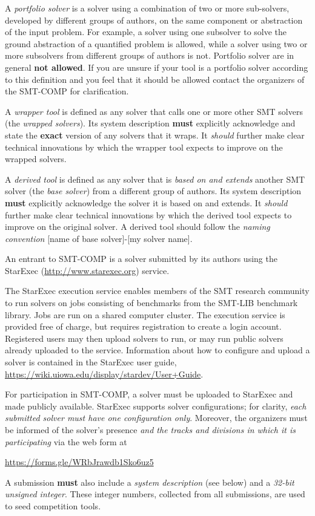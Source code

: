 \documentclass[12pt]{article}
\begin{document}
%
A \emph{portfolio solver} is a solver using a combination of two or
more sub-solvers, developed by different groups of authors, on the
same component or abstraction of the input problem.  For example, a
solver using one subsolver to solve the ground abstraction of a
quantified problem is allowed, while a solver using two or more
subsolvers from different groups of authors is not.
Portfolio solver are in general \textbf{not allowed}.
If you are unsure if your tool is a portfolio solver according to this
definition and you feel that it should be allowed contact the
organizers of the SMT-COMP for clarification.

%
A \emph{wrapper tool} is defined as any solver that calls one or more other SMT
solvers (the \emph{wrapped solvers}). Its system description \textbf{must}
explicitly acknowledge and state the \textbf{exact} version of any solvers that
it wraps.  It \emph{should} further make clear technical innovations by which
the wrapper tool expects to improve on the wrapped solvers.

%
A \emph{derived tool} is defined as any solver that is \emph{based on and
extends} another SMT solver (the \emph{base solver}) from a different
group of authors.  Its system description
\textbf{must} explicitly acknowledge
the solver it is based on and extends.  It \emph{should} further make clear
technical innovations by which the derived tool expects to improve on the
original solver.  A derived tool should follow the \emph{naming convention}
{[name of base solver]-[my solver name]}.

%
An entrant to SMT-COMP is a solver submitted by its authors using
the StarExec (\url{http://www.starexec.org}) service.

%
The StarExec execution
service enables members of the SMT research community to run solvers
on jobs consisting of benchmarks from the SMT-LIB benchmark library.
Jobs are run on a shared computer cluster.  The execution service is
provided free of charge, but requires registration to create a
login account.  Registered users may then upload solvers to
run, or may run public solvers already uploaded to the service.
Information about how to configure and upload a solver is contained in
the StarExec user guide,
\url{https://wiki.uiowa.edu/display/stardev/User+Guide}.

%
For participation in SMT-COMP, a solver must be uploaded to StarExec
and made publicly available.  StarExec supports solver configurations;
for clarity, \emph{each submitted solver must have one configuration
  only}.  Moreover, the organizers must be informed of the solver's
presence \emph{and the tracks and divisions in which it is
  participating} via the web form at
\begin{center}
  \url{https://forms.gle/WRbJrawdb1Sko6uz5}
\end{center}
A submission \textbf{must} also include a \emph{system description} (see below)
and a \emph{32-bit unsigned integer}.
 These integer numbers, collected from all submissions, are used to seed
 competition tools.
\end{document}

